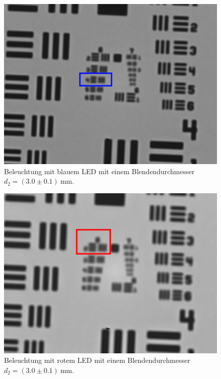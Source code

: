 \documentclass{article}
\begin{document}
\begin{minipage}[t]{.45\textwidth}
\begin{figure}[H]
\includegraphics[scale=0.5]{tm/Bild_blau_mittlere Lochblende.jpg}
\caption{Beleuchtung mit blauem LED mit einem Blendendurchmesser $d_2=(3.0\pm0.1)~$mm.}
\label{fig:bbild_3_blau_tm}
\end{figure}
\end{minipage}
\hfill
\noindent
\begin{minipage}[t]{.45\textwidth}
\begin{figure}[H]
\includegraphics[scale=0.5]{tm/Bild_rot_mittlere Lochblende.jpg}
\caption{Beleuchtung mit rotem LED mit einem Blendendurchmesser $d_2=(3.0\pm0.1)~$mm.}
\label{fig:bbild_3_rot_tm}
\end{figure}
\end{minipage}
\end{document}
